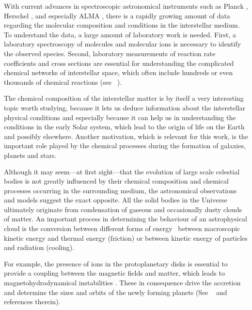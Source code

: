 With current advances in spectroscopic astronomical instruments such
as Planck \citep{planck2011}, Herschel \citep{herschel2010},
and especially ALMA \citep{semenov2008}, there is a rapidly growing
amount of data
regarding the molecular composition and conditions in the interstellar
medium. To understand the data, a large amount of laboratory work is needed.
First, a laboratory spectroscopy of molecules and molecular ions is necessary
to identify the observed species. Second, laboratory measurements of
reaction rate coefficients and cross sections are essential for understanding
the complicated chemical networks of interstellar space, which often
include hundreds or even thousands of chemical reactions (see \eg\ 
\cite{woodall2007}).

The chemical composition of the interstellar matter is by itself
a very interesting topic worth studying, because it lets us deduce information
about the interstellar physical conditions and especially because it can help
us in understanding the conditions in the early Solar system, which lead to the
origin of life on the Earth and possibly elsewhere. Another motivation,
which is relevant for this work, is the important role played by the
chemical processes during the formation of galaxies, planets and stars.

Although it may seem---at first sight---that the evolution of large scale
celestial bodies is not greatly influenced by their chemical
composition and chemical processes occurring in the surrounding medium,
the astronomical observations and models suggest the exact opposite.
All the solid bodies in the Universe ultimately originate from
condensation of gaseous and occasionally dusty clouds of matter. An
important process in determining the behaviour of an astrophysical
cloud is the conversion between different forms of energy \eg\ between
macroscopic kinetic energy and thermal energy (friction) or between
kinetic energy of particles and radiation (cooling).

For example, the presence of ions in the protoplanetary disks is essential
to provide a coupling between the magnetic fields and matter, which leads
to magnetohydrodynamical instabilities \citep{balbus1991}. These in
consequence drive the
accretion and determine the sizes and orbits of the newly forming planets
(See \eg\ \cite{wardle2007,semenov2008} and references therein).

